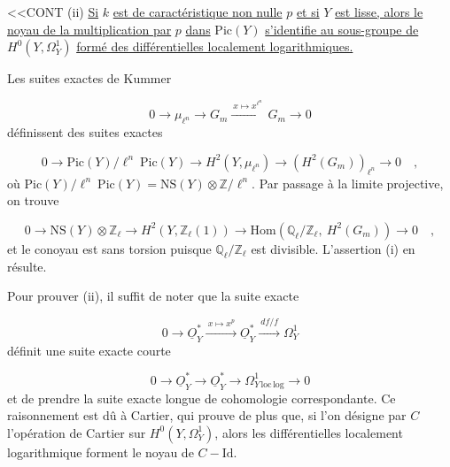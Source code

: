 
<<CONT (ii) \underline{Si} $k$ \underline{est de caractéristique non nulle} $p$ \underline{et si} $Y$ \underline{est lisse, alors le noyau de la multiplication par} $p$ \underline{dans} $\mathrm{Pic}(Y)$ \underline{s'identifie au sous-groupe de} $H^0(Y,\Omega^1_Y)$ \underline{formé des différentielles localement logarithmiques.}

Les suites exactes de Kummer

\begin{equation*}
0 \longrightarrow \mu_{\ell^n} \longrightarrow G_m \xrightarrow{\ x \mapsto x^{\ell^n}\ } G_m \longrightarrow 0
\end{equation*}
définissent des suites exactes

\begin{equation*}
0 \longrightarrow \mathrm{Pic}(Y)/\ell^n\ \mathrm{Pic}(Y) \longrightarrow H^2(Y,\mu_{\ell^n}) \longrightarrow (H^2(G_m))_{\ell^n} \longrightarrow 0 \quad ,
\end{equation*}
où $\mathrm{Pic}(Y)/\ell^n\ \mathrm{Pic}(Y) = \mathrm{NS}(Y) \otimes \mathbb{Z}/\ell^n$. Par passage à la limite projective, on trouve

\begin{equation*}
0 \longrightarrow \mathrm{NS}(Y) \otimes \mathbb{Z}_\ell \longrightarrow H^2(Y, \mathbb{Z}_\ell(1)) \longrightarrow \mathrm{Hom}(\mathbb{Q}_\ell / \mathbb{Z}_\ell,\ H^2(G_m)) \longrightarrow 0 \quad ,
\end{equation*}
et le conoyau est sans torsion puisque $\mathbb{Q}_\ell / \mathbb{Z}_\ell$ est divisible. L'assertion (i) en résulte.

Pour prouver (ii), il suffit de noter que la suite exacte

\begin{equation*}
0 \longrightarrow \underline{O}^*_Y \xrightarrow{\ x \longmapsto x^p\ } \underline{O}^*_Y \xrightarrow{\ df/f\ } \Omega^1_Y
\end{equation*}
définit une suite exacte courte

\begin{equation*}
0 \longrightarrow \underline{O}^*_Y \longrightarrow \underline{O}^*_Y \longrightarrow \Omega^1_{Y\,\mathrm{loc}\,\mathrm{log}} \longrightarrow 0
\end{equation*}
et de prendre la suite exacte longue de cohomologie correspondante. Ce raisonnement est dû à Cartier, qui prouve de plus que, si l'on désigne par $C$ l'opération de Cartier sur $H^0(Y,\Omega^1_Y)$, alors les différentielles localement logarithmique forment le noyau de $C - \mathrm{Id}$.

